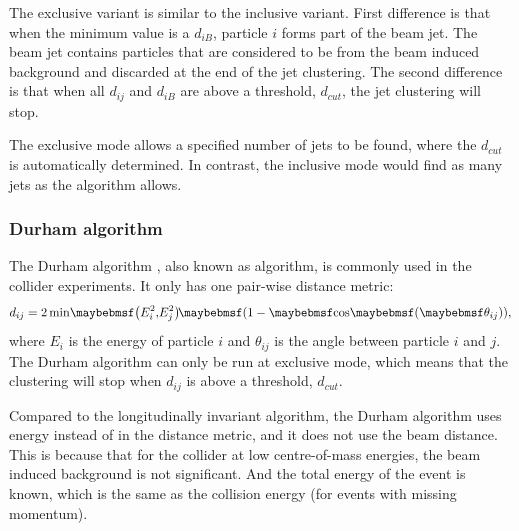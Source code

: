 

The exclusive variant is similar to the inclusive variant. First difference is that when the minimum value is  a $d_{iB}$, particle $i$ forms part of the beam jet. The beam jet contains particles that are considered to be from the beam induced background and discarded at the end of the jet clustering. The second difference is that when all $d_{ij}$ and $d_{iB}$ are above a threshold, $d_{cut}$, the jet clustering will stop.

The exclusive mode allows a specified number of jets to be found, where the $d_{cut}$ is automatically determined. In contrast, the inclusive mode would find as many jets as the algorithm allows.


\subsubsection{Durham algorithm}
\label{sec:pandoraJetDurham}
The Durham algorithm \cite{Catani:1991hj}, also known as \ee \kt algorithm, is commonly used in the \ee collider experiments. It only has one pair-wise distance metric:
\begin{equation}
d_{ij} = 2\min\!\parenths{E_i^2,\!E_j^2}\!\parenths{1 - \cosOf{\theta_{ij}}},
\end{equation}
where $E_i$ is the energy of particle $i$ and $\theta_{ij}$ is the angle between particle $i$ and $j$. The Durham algorithm can only be run at exclusive mode, which means that the clustering will stop when $d_{ij}$ is above a threshold, $d_{cut}$.

Compared to the longitudinally invariant \kt algorithm, the Durham algorithm uses energy instead of \pT in the distance metric, and it does not use the beam distance. This is because that for the \ee collider at low centre-of-mass energies, the beam induced background is not significant. And the total energy of the event is known, which is the same as the collision energy (for events with missing momentum).



